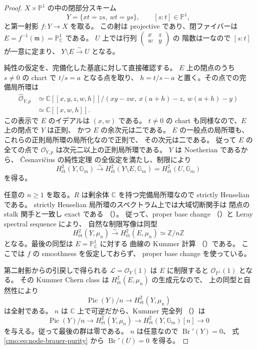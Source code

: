 \begin{proof}
$X\times\mathbb P^1$ の中の閉部分スキーム
\[
 Y=\{xt=zs,\ wt=ys\},
 \qquad [s:t]\in\mathbb P^1,
\]
と第一射影 $f:Y\to X$ を取る。
この射は projective であり、閉ファイバーは
$E=f^{-1}(\mathfrak m)=\mathbb P^1_{\mathbb C}$ である。
$U$ 上では行列
$\left(\begin{smallmatrix}x&z\\w&y\end{smallmatrix}\right)$ の
階数は一なので $[s:t]$ が一意に定まり、
$Y\setminus E\xrightarrow{\sim}U$ となる。

純性の仮定を、完備化した基底に対して直接確認する。
$E$ 上の閉点のうち $s\ne0$ の chart で $t/s=a$ となる点を取り、
$h=t/s-a$ と置く。その点での完備局所環は
\[
 \begin{split}
 \widehat{\mathcal O}_{Y,p}
 &\simeq
 \mathbb C[[x,y,z,w,h]]/
 (xy-zw,\ x(a+h)-z,\ w(a+h)-y)\\
 &\simeq \mathbb C[[x,w,h]].
 \end{split}
\]
この表示で $E$ のイデアルは $(x,w)$ である。
$t\ne0$ の chart も同様なので、$E$ 上の閉点で $Y$ は正則、
かつ $E$ の余次元は二である。
$E$ の一般点の局所環も、これらの正則局所環の局所化なので正則で、
その次元は二である。
従って $E$ の全ての点で $\mathcal O_{Y,p}$ は次元二以上の正則局所環である。
$Y$ は Noetherian であるから、
\v{C}esnavi\v{c}ius の純性定理
\cite[Theorem~1.1 (=Theorem~6.1)]{CMOCesnaviciusBrauer}
の全仮定を満たし、制限により
\begin{equation}
 H^2_{\text{ét}}(Y,\mathbb G_m)
 \xrightarrow{\sim}
 H^2_{\text{ét}}(Y\setminus E,\mathbb G_m)
 =
 H^2_{\text{ét}}(U,\mathbb G_m)
 \label{cmo:eq:node-brauer-purity}
\end{equation}
を得る。

任意の $n\ge1$ を取る。$R$ は剰余体 $\mathbb C$ を持つ完備局所環なので
strictly Henselian である。
strictly Henselian 局所環のスペクトラム上では大域切断関手は
閉点の stalk 関手と一致し exact である
（\cite[Lemma~59.55.1, Tag~03QN]{CMOStacksNode}）。
従って、proper base change
（\cite[Theorem~59.91.11, Tag~095T]{CMOStacksNode}）と Leray spectral sequence により、
自然な制限写像は同型
\[
 H^2_{\text{ét}}(Y,\mu_n)
 \xrightarrow{\sim}
 H^2_{\text{ét}}(E,\mu_n)
 \simeq\mathbb Z/n\mathbb Z
\]
となる。最後の同型は $E=\mathbb P^1_{\mathbb C}$ に対する
曲線の Kummer 計算
（\cite[Lemma~59.69.1, Tag~03RQ]{CMOStacksNode}）である。
ここでは $f$ の smoothness を仮定しておらず、
proper base change を使っている。

第二射影からの引戻しで得られる $\mathcal L=\mathcal O_Y(1)$ は
$E$ に制限すると $\mathcal O_{\mathbb P^1}(1)$ となる。
その Kummer Chern class は
$H^2_{\text{ét}}(E,\mu_n)$ の生成元なので、
上の同型と自然性により
\[
 \operatorname{Pic}(Y)/n
 \longrightarrow H^2_{\text{ét}}(Y,\mu_n)
\]
は全射である。
$n$ は $\mathbb C$ 上で可逆だから、Kummer 完全列
（\cite[Lemma~59.28.1, Tag~03PK]{NFMStacksKummer}）は
\[
 \operatorname{Pic}(Y)/n
 \longrightarrow H^2_{\text{ét}}(Y,\mu_n)
 \longrightarrow H^2_{\text{ét}}(Y,\mathbb G_m)[n]
 \longrightarrow0
\]
を与える。従って最後の群は零である。
$n$ は任意なので $\operatorname{Br}'(Y)=0$、
式 \eqref{cmo:eq:node-brauer-purity} から
$\operatorname{Br}'(U)=0$ を得る。


\end{proof}
